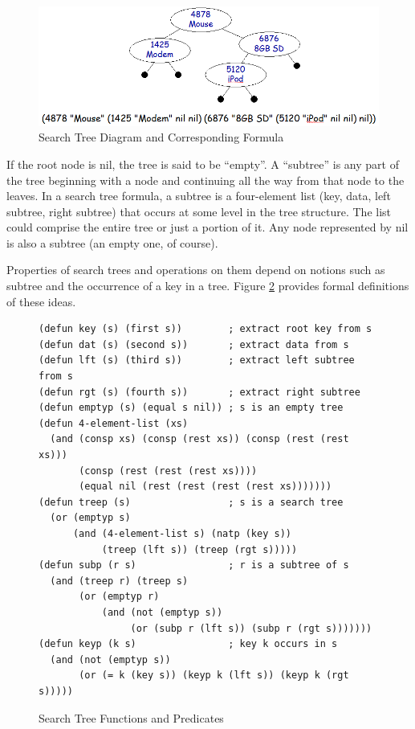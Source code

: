 \begin{figure}
\begin{center}
\includegraphics[scale=0.5]{images/searchtree.png}
\end{center}
\caption{Search Tree Diagram and Corresponding Formula}
\label{fig:searchtree-diagram}
\end{figure}

\label{empty-tree}
If the root node is nil, the tree is said to be ``empty''.
\label{subtree}
A ``subtree'' is any part of the tree beginning with a node
and continuing all the way from that node to the leaves.
In a search tree formula, a subtree is a
four-element list (key, data, left subtree, right subtree)
that occurs at some level in the tree structure.
The list could comprise the entire tree or just a portion of it.
Any node represented by nil is also a subtree (an empty one, of course).

Properties of search trees and operations on
them depend on notions such as subtree
and the occurrence of a key in a tree.
Figure \ref{fig:tree-functions} provides formal definitions of these ideas.

\begin{figure}
\begin{center}
\begin{lstlisting}
(defun key (s) (first s))        ; extract root key from s
(defun dat (s) (second s))       ; extract data from s
(defun lft (s) (third s))        ; extract left subtree from s
(defun rgt (s) (fourth s))       ; extract right subtree
(defun emptyp (s) (equal s nil)) ; s is an empty tree
(defun 4-element-list (xs)
  (and (consp xs) (consp (rest xs)) (consp (rest (rest xs)))
       (consp (rest (rest (rest xs))))
       (equal nil (rest (rest (rest (rest xs)))))))
(defun treep (s)                 ; s is a search tree
  (or (emptyp s)
      (and (4-element-list s) (natp (key s))
           (treep (lft s)) (treep (rgt s)))))
(defun subp (r s)                ; r is a subtree of s
  (and (treep r) (treep s)
       (or (emptyp r)
           (and (not (emptyp s))
                (or (subp r (lft s)) (subp r (rgt s)))))))
(defun keyp (k s)                ; key k occurs in s
  (and (not (emptyp s))
       (or (= k (key s)) (keyp k (lft s)) (keyp k (rgt s)))))
\end{lstlisting}
\end{center}
\caption{Search Tree Functions and Predicates}
\label{fig:tree-functions}
\end{figure}

